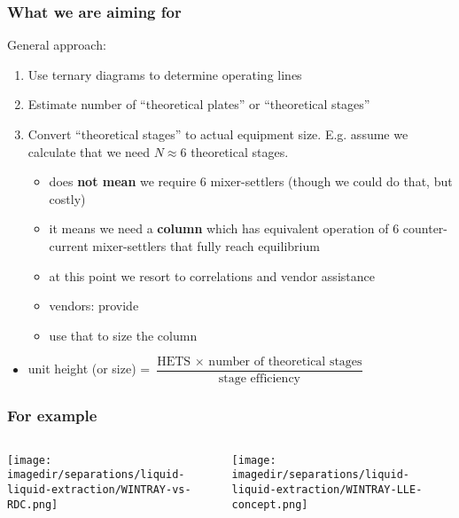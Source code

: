 \begin{frame}\frametitle{What we are aiming for}
	\vspace{12pt}
	General approach:
	\begin{enumerate}
		\item	Use ternary diagrams to determine operating lines
		\item	Estimate number of ``theoretical plates'' or ``theoretical stages''
		\item	Convert ``theoretical stages'' to actual equipment size. E.g. assume we calculate that we need $N\approx 6$ theoretical stages.
			\begin{itemize}
				\item	does \textbf{not mean} we require 6 mixer-settlers (though we could do that, but costly)
				\item	it means we need a \textbf{column} which has equivalent operation of 6 counter-current mixer-settlers that fully reach equilibrium
				\item	at this point we resort to correlations and vendor assistance
				\item	vendors: provide {\color{purple}{HETS = height equivalent to a theoretical stage}}
				\item	use that to size the column
			\end{itemize}
	\end{enumerate}
	\begin{itemize}
		\item	unit height (or size) = $\dfrac{\text{HETS} \,\, \times \,\, \text{number of theoretical stages}}{\text{stage efficiency}}$
	\end{itemize}
\end{frame}

\begin{frame}\frametitle{For example}

	\begin{columns}[t]
			\begin{center}
				\texttt{[image: \\imagedir/separations/liquid-liquid-extraction/WINTRAY-vs-RDC.png]}
			\end{center}
			\begin{center}
				\texttt{[image: \\imagedir/separations/liquid-liquid-extraction/WINTRAY-LLE-concept.png]}
			\end{center}
	\end{columns}

	\vspace{24pt}
\end{frame}

